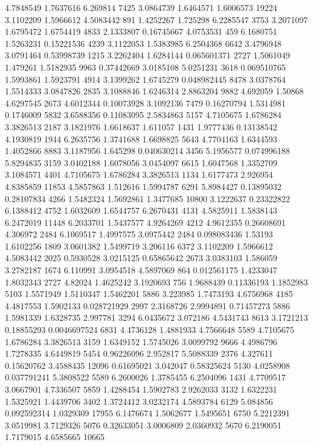 4.7848549 1.7637616 6.269814 7425
3.0864739 1.6464571 1.6006573 19224
3.1102209 1.5966612 4.5083442 891
1.4252267 1.725298 6.2285547 3753
3.2071097 1.6795472 1.6754419 4833
2.1333807 0.16745667 4.0753531 459
6.1680751 1.5263231 0.15221536 4239
3.1122053 1.5383985 6.2504368 6642
3.4796948 3.0791464 0.53998739 1215
3.2262404 1.6284144 0.065601371 2727
1.5061049 1.479261 1.5182935 9963
0.37442669 3.0185108 5.0251231 3618
0.069510765 1.5993861 1.5923791 4914
3.1399262 1.6745279 0.048982445 8478
3.0378764 1.5514333 3.0847826 2835
3.1088846 1.6246314 2.8863204 9882
4.692059 1.50868 4.6297545 2673
4.6012344 0.10073928 3.1092136 7479
0.16270794 1.5314981 0.1746009 5832
3.6588356 0.11083095 2.5834863 5157
4.7105675 1.6786284 3.3826513 2187
3.1821976 1.6618637 1.611057 1431
1.9777436 0.13138542 4.1930819 1944
6.2635756 1.3741688 1.6698825 5643
4.7704163 1.6344593 1.4052866 8883
3.1187956 1.645298 0.040630214 3456
5.1956577 0.074996188 5.8294835 3159
3.0402188 1.6078056 3.0454097 6615
1.6047568 1.3352709 3.1084571 4401
4.7105675 1.6786284 3.3826513 1134
1.6177473 2.926954 4.8385859 11853
4.5857863 1.512616 1.5994787 6291
5.8984427 0.13895032 0.28107834 4266
1.5482324 1.5692861 1.3477685 10800
3.1222637 0.23322822 6.1388412 4752
1.6032609 1.6544757 6.2670431 4131
4.5825911 1.5838143 6.2472019 11448
6.2033701 1.5437577 4.9264269 4212
4.9612355 0.26608691 4.306972 2484
6.1069517 1.4997575 3.0975442 2484
0.098083436 1.53193 1.6102256 1809
3.0601382 1.5499719 3.206116 6372
3.1102209 1.5966612 4.5083442 2025
0.5930528 3.0215125 0.65865642 2673
3.0383103 1.586059 3.2782187 1674
6.110991 3.0954518 4.5897069 864
0.012561175 1.4233047 1.8032343 2727
4.82024 1.4625242 3.1920693 756
1.9688439 0.11336193 1.1852983 5103
1.5571949 1.5110347 1.5462201 5886
3.223985 1.7473193 4.6756968 4185
4.4817553 1.5902133 0.028721929 2997
2.3168726 2.9994891 0.71457273 5886
1.5981339 1.6328735 2.997781 3294
6.0435672 3.072186 4.5431743 8613
3.1721213 0.18855293 0.0046697524 6831
4.4736128 1.4881933 4.7566648 5589
4.7105675 1.6786284 3.3826513 3159
1.6349152 1.5745026 3.0099792 9666
4.4986796 1.7278335 4.6449819 5454
0.96226096 2.952817 5.5088339 2376
4.327611 0.15620762 3.4588435 12096
0.61695021 3.042047 0.58325624 5130
4.0258908 0.037791241 5.3808522 5589
6.2600026 1.3785455 6.2504096 1431
4.7709517 3.0667901 4.7336507 5859
1.4288454 1.5902783 2.9262033 3132
1.6322231 1.5325921 1.4439706 3402
1.3724412 3.0232174 4.5893784 6129
5.084856 0.092592314 1.0329309 17955
6.1476674 1.5062677 1.5495651 6750
5.2212391 3.0519981 3.7129326 5076
0.32633051 3.0006809 2.0360932 5670
6.2190051 1.7179015 4.6585665 10665
